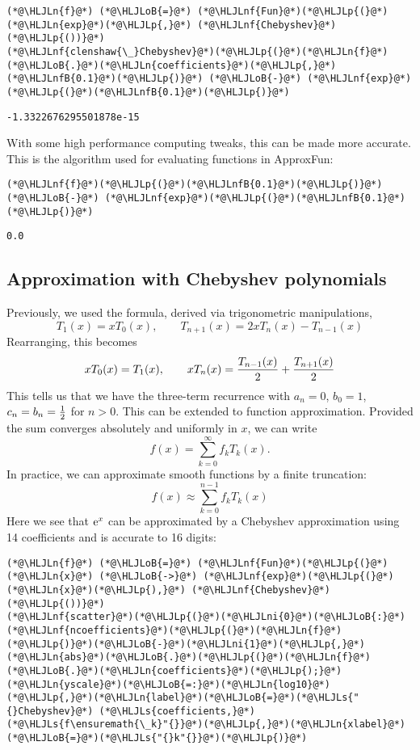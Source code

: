 \documentclass[12pt,landscape]{article}
\newcommand{\HLJLn}[1]{#1}
\newcommand{\HLJLnf}[1]{\textcolor[RGB]{66,102,213}{#1}}
\newcommand{\HLJLs}[1]{\textcolor[RGB]{201,61,57}{#1}}
\newcommand{\HLJLnfB}[1]{\textcolor[RGB]{59,151,46}{#1}}
\newcommand{\HLJLni}[1]{\textcolor[RGB]{59,151,46}{#1}}
\newcommand{\HLJLoB}[1]{\textcolor[RGB]{102,102,102}{\textbf{#1}}}
\newcommand{\HLJLp}[1]{#1}
\def\E{ {\rm e} }
\begin{document}
{\begin{lstlisting}
(*@\HLJLn{f}@*) (*@\HLJLoB{=}@*) (*@\HLJLnf{Fun}@*)(*@\HLJLp{(}@*)(*@\HLJLn{exp}@*)(*@\HLJLp{,}@*) (*@\HLJLnf{Chebyshev}@*)(*@\HLJLp{())}@*)
(*@\HLJLnf{clenshaw{\_}Chebyshev}@*)(*@\HLJLp{(}@*)(*@\HLJLn{f}@*)(*@\HLJLoB{.}@*)(*@\HLJLn{coefficients}@*)(*@\HLJLp{,}@*) (*@\HLJLnfB{0.1}@*)(*@\HLJLp{)}@*) (*@\HLJLoB{-}@*) (*@\HLJLnf{exp}@*)(*@\HLJLp{(}@*)(*@\HLJLnfB{0.1}@*)(*@\HLJLp{)}@*)
\end{lstlisting}

\begin{lstlisting}
-1.3322676295501878e-15
\end{lstlisting}


With some high performance computing tweaks, this can be made more accurate. This is the algorithm used for evaluating functions in ApproxFun:


\begin{lstlisting}
(*@\HLJLnf{f}@*)(*@\HLJLp{(}@*)(*@\HLJLnfB{0.1}@*)(*@\HLJLp{)}@*) (*@\HLJLoB{-}@*) (*@\HLJLnf{exp}@*)(*@\HLJLp{(}@*)(*@\HLJLnfB{0.1}@*)(*@\HLJLp{)}@*)
\end{lstlisting}

\begin{lstlisting}
0.0
\end{lstlisting}


\subsection{Approximation with Chebyshev polynomials}
Previously, we used the formula, derived via trigonometric manipulations,
\[
T_1(x) = x T_0(x), \qquad
T_{n+1}(x) = 2x T_n(x) - T_{n-1}(x)
\]
Rearranging, this becomes
\[
 x T_0(x) = T_1(x), \qquad
x T_n(x)  =  {T_{n-1}(x) \over 2} + {T_{n+1}(x) \over 2}
\]
This tells us that we have the three-term recurrence with $a_n = 0$, $b_0 = 1$, $c_n = b_n = {1 \over 2}$ for $n > 0$. This can be extended to function approximation. Provided the sum converges absolutely and uniformly in $x$, we can write
\[
f(x) = \sum_{k=0}^\infty f_k T_k(x).
\]
In practice, we can approximate smooth functions by a finite truncation:
\[
f(x) \approx  \sum_{k=0}^{n-1} f_k T_k(x)
\]
Here we see that $\E^x$ can be approximated by a Chebyshev approximation using 14 coefficients and is accurate to 16 digits:


\begin{lstlisting}
(*@\HLJLn{f}@*) (*@\HLJLoB{=}@*) (*@\HLJLnf{Fun}@*)(*@\HLJLp{(}@*)(*@\HLJLn{x}@*) (*@\HLJLoB{->}@*) (*@\HLJLnf{exp}@*)(*@\HLJLp{(}@*)(*@\HLJLn{x}@*)(*@\HLJLp{),}@*) (*@\HLJLnf{Chebyshev}@*)(*@\HLJLp{())}@*)
(*@\HLJLnf{scatter}@*)(*@\HLJLp{(}@*)(*@\HLJLni{0}@*)(*@\HLJLoB{:}@*)(*@\HLJLnf{ncoefficients}@*)(*@\HLJLp{(}@*)(*@\HLJLn{f}@*)(*@\HLJLp{)}@*)(*@\HLJLoB{-}@*)(*@\HLJLni{1}@*)(*@\HLJLp{,}@*)(*@\HLJLn{abs}@*)(*@\HLJLoB{.}@*)(*@\HLJLp{(}@*)(*@\HLJLn{f}@*)(*@\HLJLoB{.}@*)(*@\HLJLn{coefficients}@*)(*@\HLJLp{);}@*)(*@\HLJLn{yscale}@*)(*@\HLJLoB{=:}@*)(*@\HLJLn{log10}@*)(*@\HLJLp{,}@*)(*@\HLJLn{label}@*)(*@\HLJLoB{=}@*)(*@\HLJLs{"{}Chebyshev}@*) (*@\HLJLs{coefficients,}@*) (*@\HLJLs{f\ensuremath{\_k}"{}}@*)(*@\HLJLp{,}@*)(*@\HLJLn{xlabel}@*)(*@\HLJLoB{=}@*)(*@\HLJLs{"{}k"{}}@*)(*@\HLJLp{)}@*)
\end{lstlisting}

}
\end{document}
